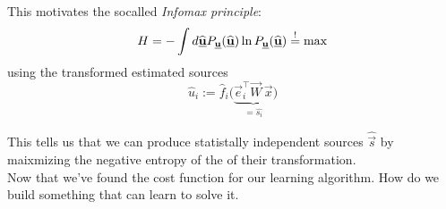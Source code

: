 This motivates the socalled \emph{Infomax principle}:
\begin{equation}\label{eq:infomax}
  H = -\int d \widehat{\underline{\mathbf{u}}} P_{\underline{\mathbf{u}}} (\widehat{\underline{\mathbf{u}}})
  \ln P_{\underline{\mathbf{u}}} (\widehat{\underline{\mathbf{u}}}) \stackrel{\mathrm{!}}{=} \max 
\end{equation}
using the transformed estimated sources
\begin{equation}
\widehat{u}_i := \widehat{f}_i \big( \underbrace{ \vec{e}_i^\top
		\vec{W} \, \vec{x}  }_{= \widehat{s_i} } \big) 
\end{equation}

This tells us that we can produce statistally independent sources $\widehat {\vec s}$ 
by maixmizing the negative entropy of the of their transformation.\\
Now that we've found the cost function for our learning algorithm. 
How do we build something that can learn to solve it.


\newpage

